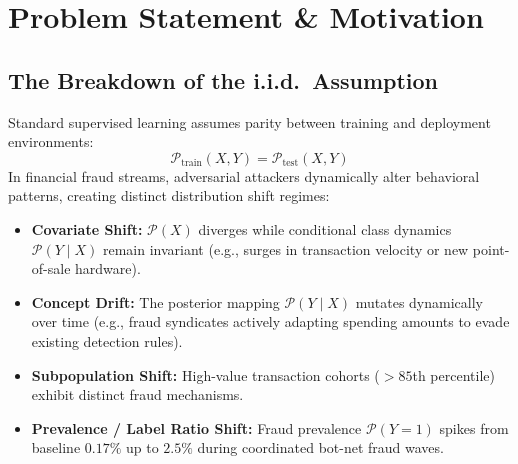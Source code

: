 \documentclass[10pt,a4paper,twocolumn]{article}
\begin{document}
\section{Problem Statement \& Motivation}

\subsection{The Breakdown of the i.i.d.\ Assumption}
Standard supervised learning assumes parity between training and deployment environments:
\begin{equation}
  \mathcal{P}_{\text{train}}(X, Y) = \mathcal{P}_{\text{test}}(X, Y)
\end{equation}
In financial fraud streams, adversarial attackers dynamically alter behavioral patterns, creating distinct distribution shift regimes:
\begin{itemize}
  \item \textbf{Covariate Shift:} $\mathcal{P}(X)$ diverges while conditional class dynamics $\mathcal{P}(Y \mid X)$ remain invariant (e.g., surges in transaction velocity or new point-of-sale hardware).
  \item \textbf{Concept Drift:} The posterior mapping $\mathcal{P}(Y \mid X)$ mutates dynamically over time (e.g., fraud syndicates actively adapting spending amounts to evade existing detection rules).
  \item \textbf{Subpopulation Shift:} High-value transaction cohorts ($>85$th percentile) exhibit distinct fraud mechanisms.
  \item \textbf{Prevalence / Label Ratio Shift:} Fraud prevalence $\mathcal{P}(Y=1)$ spikes from baseline $0.17\%$ up to $2.5\%$ during coordinated bot-net fraud waves.
\end{itemize}
\end{document}
